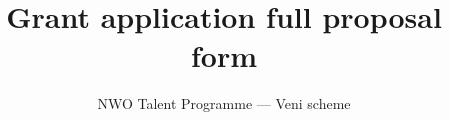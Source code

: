\documentclass[9.5pt]{Veni}
\title{Grant application full proposal form}
\subtitle{NWO Talent Programme --- Veni scheme}
\begin{document}
\makenwotitle






\end{document}

